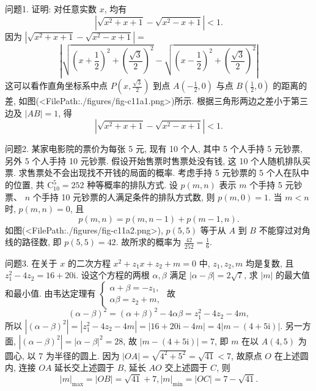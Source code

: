
问题1. 证明: 对任意实数 $x$, 均有
$$
\left|\sqrt{x^2+x+1}-\sqrt{x^2-x+1}\right|<1 .
$$
因为 $\left|\sqrt{x^2+x+1}-\sqrt{x^2-x+1}\right|=$
$$
\left|\sqrt{\left(x+\frac{1}{2}\right)^2+\left(\frac{\sqrt{3}}{2}\right)^2}-\sqrt{\left(x-\frac{1}{2}\right)^2+\left(\frac{\sqrt{3}}{2}\right)^2}\right|
$$
这可以看作直角坐标系中点 $P\left(x, \frac{\sqrt{3}}{2}\right)$ 到点 $A\left(-\frac{1}{2}, 0\right)$ 与点 $B\left(\frac{1}{2}, 0\right)$ 的距离的差, 如图(<FilePath:./figures/fig-c11a1.png>)所示.
根据三角形两边之差小于第三边及 $|A B|=1$, 得
$$
\left|\sqrt{x^2+x+1}-\sqrt{x^2-x+1}\right|<1 .
$$



问题2. 某家电影院的票价为每张 5 元, 现有 10 个人, 其中 5 个人手持 5 元钞票, 另外 5 个人手持 10 元钞票.
假设开始售票时售票处没有钱, 这 10 个人随机排队买票.
求售票处不会出现找不开钱的局面的概率.
考虑手持 5 元钞票的 5 个人在队中的位置, 共 $\mathrm{C}_{10}^5=252$ 种等概率的排队方式.
设 $p(m, n)$ 表示 $m$ 个手持 5 元钞票、 $n$ 个手持 10 元钞票的人满足条件的排队方式数, 则 $p(m, 0)=1$. 当 $m<n$ 时, $p(m, n)=0$, 且
$$
p(m, n)=p(m, n-1)+p(m-1, n) .
$$
如图(<FilePath:./figures/fig-c11a2.png>), $p(5,5)$ 等于从 $A$ 到 $B$ 不能穿过对角线的路径数, 即 $p(5,5)=42$.
故所求的概率为 $\frac{42}{252}=\frac{1}{6}$.



问题3. 在关于 $x$ 的二次方程 $x^2+z_1 x+z_2+m=0$ 中, $z_1, z_2, m$ 均是复数, 且 $z_1^2-4 z_2=16+20 \mathrm{i}$. 设这个方程的两根 $\alpha, \beta$ 满足 $|\alpha-\beta|=2 \sqrt{7}$, 求 $|m|$ 的最大值和最小值.
由韦达定理有 $\left\{\begin{array}{l}\alpha+\beta=-z_1, \\ \alpha \beta=z_2+m,\end{array}\right.$ 故
$$
(\alpha-\beta)^2=(\alpha+\beta)^2-4 \alpha \beta=z_1^2-4 z_2-4 m,
$$
所以 $\left|(\alpha-\beta)^2\right|=\left|z_1^2-4 z_2-4 m\right|=|16+20 \mathrm{i}-4 m|=4|m-(4+5 \mathrm{i})|$.
另一方面, $\left|(\alpha-\beta)^2\right|=|\alpha-\beta|^2=28$, 故 $|m-(4+5 \mathrm{i})|=7$, 即 $m$ 在以 $A(4,5)$ 为圆心, 以 7 为半径的圆上.
因为 $|O A|=\sqrt{4^2+5^2}=\sqrt{41}<7$, 故原点 $O$ 在上述圆内, 连接 $O A$ 延长交上述圆于 $B$, 延长 $A O$ 交上述圆于 $C$, 则
$$
|m|_{\max }=|O B|=\sqrt{41}+7,|m|_{\min }=|O C|=7-\sqrt{41} .
$$



